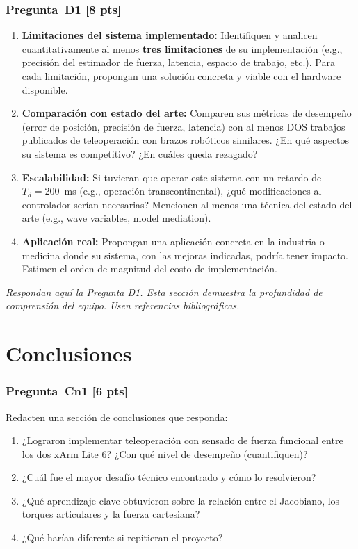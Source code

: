 \documentclass[journal,10pt,twoside]{IEEEtran}
\newcommand{\pts}[1]{\textcolor{tec_red}{\textbf{[#1 pts]}}}
\newcommand{\TODO}[1]{\begin{todobox}[Respuesta del equipo]
  \textit{#1}
\end{todobox}}
\begin{document}
\subsubsection*{Pregunta~D1 \pts{8}}
\begin{enumerate}[label=(\alph*)]
  \item \textbf{Limitaciones del sistema implementado:}
        Identifiquen y analicen cuantitativamente al menos \textbf{tres
        limitaciones} de su implementación (e.g., precisión del
        estimador de fuerza, latencia, espacio de trabajo, etc.).
        Para cada limitación, propongan una solución concreta y
        viable con el hardware disponible.
  \item \textbf{Comparación con estado del arte:}
        Comparen sus métricas de desempeño (error de posición,
        precisión de fuerza, latencia) con al menos DOS trabajos
        publicados de teleoperación con brazos robóticos similares.
        ¿En qué aspectos su sistema es competitivo? ¿En cuáles
        queda rezagado?
  \item \textbf{Escalabilidad:} Si tuvieran que operar este sistema
        con un retardo de $T_d = 200$~ms (e.g., operación
        transcontinental), ¿qué modificaciones al controlador
        serían necesarias? Mencionen al menos una técnica
        del estado del arte (e.g., wave variables, model mediation).
  \item \textbf{Aplicación real:} Propongan una aplicación concreta
        en la industria o medicina donde su sistema, con las mejoras
        indicadas, podría tener impacto. Estimen el orden de magnitud
        del costo de implementación.
\end{enumerate}

\TODO{Respondan aquí la Pregunta D1. Esta sección demuestra la
profundidad de comprensión del equipo. Usen referencias bibliográficas.}

\section{Conclusiones}
\label{sec:conclusions}

\subsubsection*{Pregunta~Cn1 \pts{6}}
Redacten una sección de conclusiones que responda:
\begin{enumerate}[label=(\alph*)]
  \item ¿Lograron implementar teleoperación con sensado de fuerza
        funcional entre los dos xArm Lite 6? ¿Con qué nivel de
        desempeño (cuantifiquen)?
  \item ¿Cuál fue el mayor desafío técnico encontrado y cómo lo resolvieron?
  \item ¿Qué aprendizaje clave obtuvieron sobre la relación entre
        el Jacobiano, los torques articulares y la fuerza cartesiana?
  \item ¿Qué harían diferente si repitieran el proyecto?
\end{enumerate}
\end{document}
